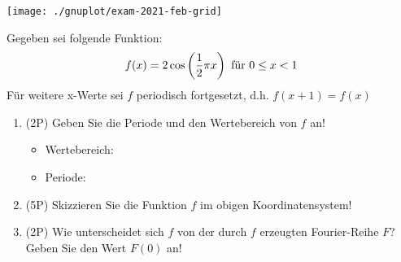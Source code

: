 \begin{center}
	\texttt{[image: ./gnuplot/exam-2021-feb-grid]}
\end{center}

Gegeben sei folgende Funktion:
$$
	f(x) = 2\cos\left(\frac{1}{2}\pi x\right) \text{ für } 0 \le x < 1 \\
$$
Für weitere x-Werte sei $f$ periodisch fortgesetzt, d.h. $f(x+1) = f(x)$

\begin{enumerate}[label=(\alph*)]

	\item (2P) Geben Sie die Periode und den Wertebereich von $f$ an!

		\begin{itemize}
			\item Wertebereich:
	
			\bigskip
			\bigskip
	
			\item Periode:
	
			\bigskip
			\bigskip
		\end{itemize}
	
	\item (5P) Skizzieren Sie die Funktion $f$ im obigen Koordinatensystem!

		\bigskip

	\item (2P) Wie unterscheidet sich $f$ von der durch $f$ erzeugten Fourier-Reihe $F$? Geben Sie den Wert $F(0)$ an!
	
\end{enumerate}
